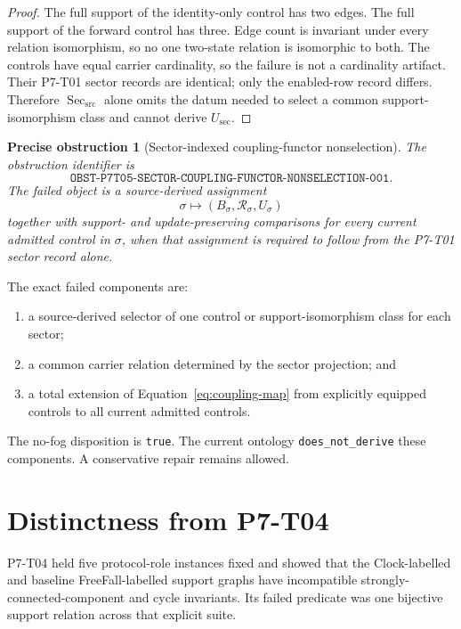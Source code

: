 \documentclass[11pt]{article}
\newtheorem{obstruction}{Precise obstruction}
\newcommand{\Sec}{\operatorname{Sec}_{\mathrm{src}}}
\newcommand{\Update}{U}
\newcommand{\Rel}{\mathcal R}
\begin{document}
\begin{proof}
The full support of the identity-only control has two edges.  The full
support of the forward control has three.  Edge count is invariant under
every relation isomorphism, so no one two-state relation is isomorphic to
both.  The controls have equal carrier cardinality, so the failure is not a
cardinality artifact.  Their P7-T01 sector records are identical; only the
enabled-row record differs.  Therefore \(\Sec\) alone omits the datum needed
to select a common support-isomorphism class and cannot derive
\(U_{\mathrm{sec}}\).
\end{proof}

\begin{obstruction}[Sector-indexed coupling-functor nonselection]
\label{obst:nonselection}
The obstruction identifier is
\[
 \texttt{OBST-P7T05-SECTOR-COUPLING-FUNCTOR-NONSELECTION-001}.
\]
The failed object is a source-derived assignment
\[
 \sigma\longmapsto
 (B_\sigma,\Rel_\sigma,\Update_\sigma)
\]
together with support- and update-preserving comparisons for every current
admitted control in \(\sigma\), when that assignment is required to follow
from the P7-T01 sector record alone.
\end{obstruction}

The exact failed components are:
\begin{enumerate}[leftmargin=*]
\item a source-derived selector of one control or support-isomorphism class
for each sector;
\item a common carrier relation determined by the sector projection; and
\item a total extension of Equation~\eqref{eq:coupling-map} from explicitly
equipped controls to all current admitted controls.
\end{enumerate}
The no-fog disposition is \texttt{true}.  The current ontology
\texttt{does\_not\_derive} these components.  A conservative repair remains
allowed.

\section{Distinctness from P7-T04}

P7-T04 held five protocol-role instances fixed and showed that the
Clock-labelled and baseline FreeFall-labelled support graphs have
incompatible strongly-connected-component and cycle invariants.  Its failed
predicate was one bijective support relation across that explicit suite.
\end{document}
